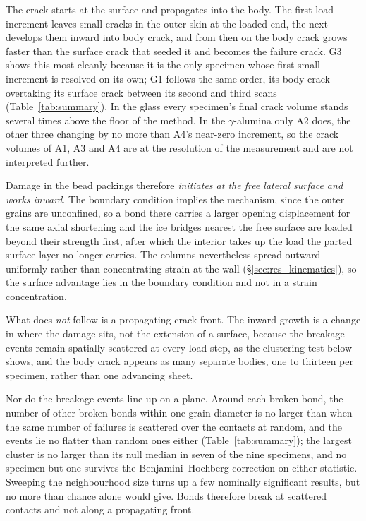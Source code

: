 \documentclass[preprint,12pt,numbers]{elsarticle}
\begin{document}
  The crack starts at the surface and propagates into the body.  The first
  load increment leaves small cracks in the outer skin at the loaded end, the
  next develops them inward into body crack, and from then on the body crack
  grows faster than the surface crack that seeded it and becomes the failure
  crack.  G3 shows this most cleanly because it is the only specimen whose
  first small increment is resolved on its own; G1 follows the same order,
  its body crack overtaking its surface crack between its second and third
  scans (Table~\ref{tab:summary}).  In the glass every specimen's final
  crack volume stands several times above the floor of the method.  In the
  $\gamma$-alumina only A2 does, the other three changing by no more than
  A4's near-zero increment, so the crack volumes of A1, A3 and A4 are at the
  resolution of the measurement and are not interpreted further.

  Damage in the bead packings therefore \emph{initiates at the free lateral
  surface and works inward}.  The boundary condition implies the mechanism, since the
  outer grains are unconfined, so a bond there carries a larger opening
  displacement for the same axial shortening and the ice bridges nearest the
  free surface are loaded beyond their strength first, after which the interior
  takes up the load the parted surface layer no longer carries.  The columns
  nevertheless spread outward uniformly rather than concentrating strain at the
  wall (\S\ref{sec:res_kinematics}), so the surface advantage lies in the
  boundary condition and not in a strain concentration.

  What does \emph{not} follow is a propagating crack front.  The inward growth
  is a change in where the damage sits, not the extension of a surface, because the
  breakage events remain spatially scattered at every load step, as the
  clustering test below shows, and the body crack appears as many separate bodies,
  one to thirteen per specimen, rather than one advancing sheet.

  \label{sec:res_planar}
  Nor do the breakage events line up on a plane.  Around each broken bond,
  the number of other broken bonds within one grain diameter is no larger than
  when the same number of failures is scattered over the contacts at random,
  and the events lie no flatter than random ones either
  (Table~\ref{tab:summary}); the largest cluster is no larger than its null
  median in seven of the nine specimens, and no specimen but one
  survives the Benjamini--Hochberg correction on either statistic.  Sweeping
  the neighbourhood size turns up a few nominally significant results, but no
  more than chance alone would give.  Bonds therefore break at scattered
  contacts and not along a propagating front.
\end{document}
